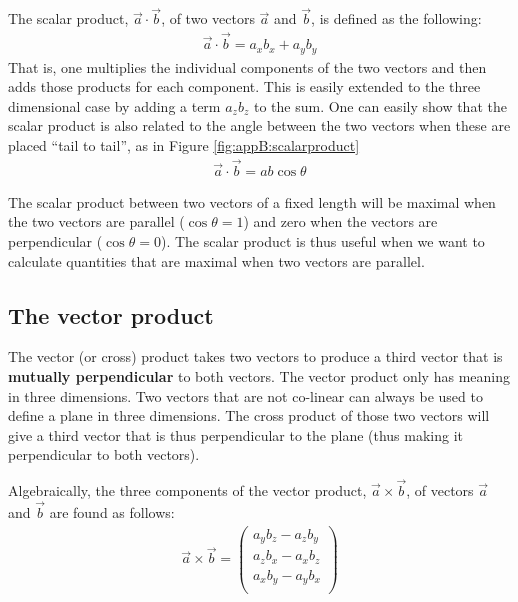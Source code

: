 The scalar product, $\vec a \cdot \vec b$, of two vectors $\vec a$ and $\vec b$, is defined as the following:
\begin{align*}
\vec a \cdot \vec b=a_xb_x +a_yb_y
\end{align*}
That is, one multiplies the individual components of the two vectors and then adds those products for each component. This is easily extended to the three dimensional case by adding a term $a_zb_z$ to the sum. One can easily show that the scalar product is also related to the angle between the two vectors when these are placed ``tail to tail'', as in Figure \ref{fig:appB:scalarproduct}
\begin{align*}
\vec a \cdot \vec b= ab\cos\theta
\end{align*}


The scalar product between two vectors of a fixed length will be maximal when the two vectors are parallel ($\cos\theta=1$) and zero when the vectors are perpendicular ($\cos\theta =0$). The scalar product is thus useful when we want to calculate quantities that are maximal when two vectors are parallel. 


\subsection{The vector product}
The vector (or cross) product takes two vectors to produce a third vector that is \textbf{mutually perpendicular} to both vectors. The vector product only has meaning in three dimensions. Two vectors that are not co-linear can always be used to define a plane in three dimensions. The cross product of those two vectors will give a third vector that is thus perpendicular to the plane (thus making it perpendicular to both vectors). 

Algebraically, the three components of the vector product, $\vec a\times \vec b$, of vectors $\vec a$ and $\vec b$ are found as follows:
\begin{align}
\label{eqn:appB:crossproduct}
\vec a \times \vec b =\begin{pmatrix}
           a_yb_z - a_z b_y\\
           a_zb_x - a_x b_z\\
           a_xb_y - a_y b_x\\
         \end{pmatrix}
\end{align}


